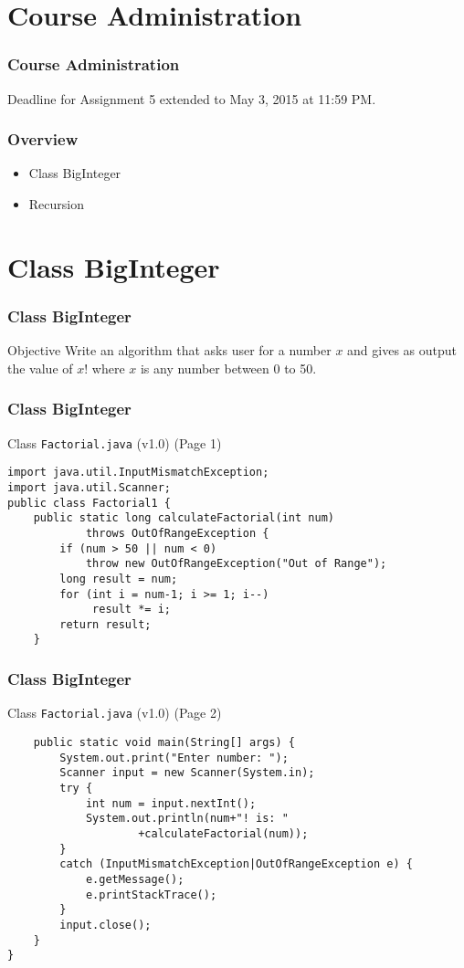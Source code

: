 \documentclass[10pt, compress]{beamer}
\begin{document}
\prepareCover

\section{Course Administration}

\begin{frame}[fragile]
\frametitle{Course Administration}
Deadline for Assignment 5 extended to May 3, 2015 at 11:59 PM.
\end{frame}

\begin{frame}[fragile]
	\frametitle{Overview}
	\begin{itemize}
		\item[] Class BigInteger
		\item[] Recursion
	\end{itemize}
\end{frame}

\section{Class BigInteger}

\begin{frame}[fragile]
\frametitle{Class BigInteger}
	\begin{block}{Objective}
		Write an algorithm that asks user for a number $x$ and gives as output the value of $x!$ where $x$ is any number between 0 to 50.
	\end{block}
\end{frame}

\begin{frame}[fragile]
\frametitle{Class BigInteger}
	\begin{block}{Class \texttt{Factorial.java} (v1.0) (Page 1)}
		\begin{verbatim}
import java.util.InputMismatchException;
import java.util.Scanner;
public class Factorial1 {
	public static long calculateFactorial(int num)
			throws OutOfRangeException {
		if (num > 50 || num < 0)
			throw new OutOfRangeException("Out of Range");
		long result = num;
		for (int i = num-1; i >= 1; i--)
			 result *= i;
		return result;
	}
		\end{verbatim}
	\end{block}
\end{frame}

\begin{frame}[fragile]
\frametitle{Class BigInteger}
	\begin{block}{Class \texttt{Factorial.java} (v1.0) (Page 2)}
		\begin{verbatim}
	public static void main(String[] args) {
		System.out.print("Enter number: ");
		Scanner input = new Scanner(System.in);
		try {
			int num = input.nextInt();
			System.out.println(num+"! is: "
					+calculateFactorial(num));
		}
		catch (InputMismatchException|OutOfRangeException e) {
			e.getMessage();
			e.printStackTrace();
		}
		input.close();
	}
}
		\end{verbatim}
	\end{block}
\end{frame}
\end{document}
